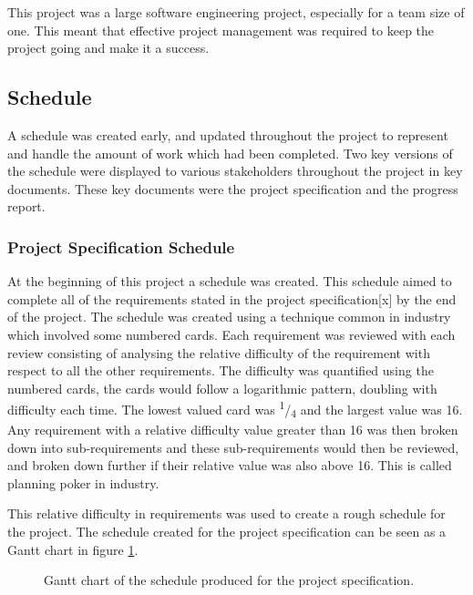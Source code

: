 \documentclass{article}
\begin{document}
This project was a large software engineering project, especially for a team size of one. This meant that effective project management was required to keep the project going and make it a success. 

\subsection{Schedule}

A schedule was created early, and updated throughout the project to represent and handle the amount of work which had been completed. Two key versions of the schedule were displayed to various stakeholders throughout the project in key documents. These key documents were the project specification and the progress report. 

\subsubsection{Project Specification Schedule}

At the beginning of this project a schedule was created. This schedule aimed to complete all of the requirements stated in the project specification[x] by the end of the project. The schedule was created using a technique common in industry which involved some numbered cards. Each requirement was reviewed with each review consisting of analysing the relative difficulty of the requirement with respect to all the other requirements. The difficulty was quantified using the numbered cards, the cards would follow a logarithmic pattern, doubling with difficulty each time. The lowest valued card was \textsuperscript{1}/\textsubscript{4} and the largest value was 16. Any requirement with a relative difficulty value greater than 16 was then broken down into sub-requirements and these sub-requirements would then be reviewed, and broken down further if their relative value was also above 16. This is called planning poker in industry. \par

This relative difficulty in requirements was used to create a rough schedule for the project. The schedule created for the project specification can be seen as a Gantt chart in figure \ref{figure:projectSpecGanttChart}. \par

\begin{figure}[H]
	\centering
	\caption{Gantt chart of the schedule produced for the project specification.}
	\label{figure:projectSpecGanttChart}
\end{figure}
\end{document}
